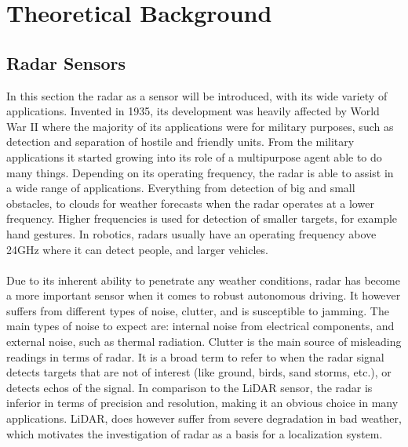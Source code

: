 \chapter{Theoretical Background}
\section{Radar Sensors}
In this section the radar as a sensor will be introduced, with its wide variety of applications. Invented in 1935, its development was heavily affected by World War II where the majority of its applications were for military purposes, such as detection and separation of hostile and friendly units. From the military applications it started growing into its role of a multipurpose agent able to do many things. Depending on its operating frequency, the radar is able to assist in a wide range of applications. Everything from detection of big and small obstacles, to clouds for weather forecasts when the radar operates at a lower frequency. Higher frequencies is used for detection of smaller targets, for example hand gestures.  In robotics, radars usually have an operating frequency above 24GHz where it can detect people, and larger vehicles.
\\\\
Due to its inherent ability to penetrate any weather conditions, radar has become a more important sensor when it comes to robust autonomous driving. It however suffers from different types of noise, clutter, and is susceptible to jamming. The main types of noise to expect are: internal noise from electrical components, and external noise, such  as thermal radiation. Clutter is the main source of misleading readings in terms of radar. It is a broad term to refer to when the radar signal detects targets that are not of interest (like ground, birds, sand storms, etc.), or detects echos of the signal. In comparison to the \ac{LiDAR} sensor, the radar is inferior in terms of precision and resolution, making it an obvious choice in many applications. \ac{LiDAR}, does however suffer from severe degradation in bad weather, which motivates the investigation of radar as a basis for a localization system.

